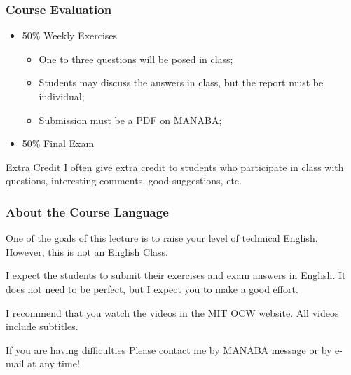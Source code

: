 \documentclass{beamer}
\begin{document}
\begin{frame}
  \frametitle{Course Evaluation}
  \begin{itemize}
  \item 50\% Weekly Exercises
    \begin{itemize}
    \item One to three questions will be posed in class;
    \item Students may discuss the answers in class, but the report must be individual;
    \item Submission must be a PDF on MANABA;
    \end{itemize}

    \bigskip
    
  \item 50\% Final Exam
  \end{itemize}

  \vfill

  \begin{block}{Extra Credit}
    I often give extra credit to students who participate in class
    with questions, interesting comments, good suggestions, etc.
  \end{block}
\end{frame}

\begin{frame}
  \frametitle{About the Course Language}

  One of the goals of this lecture is to raise your level of technical
  English. However, this is not an English Class.

  \bigskip
  
  I expect the students to submit their exercises and exam answers in
  English. It does not need to be perfect, but I expect you to make a
  good effort.

  \bigskip

  I recommend that you watch the videos in the MIT OCW website. All
  videos include subtitles.

  \begin{block}{If you are having difficulties}
    Please contact me by MANABA message or by e-mail at any time!
  \end{block}
  
\end{frame}
\end{document}

